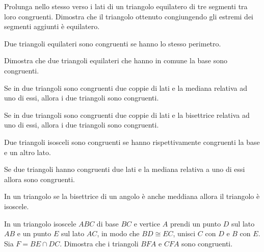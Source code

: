 \begin{multicols}{2}
\begin{esercizio}
\label{ese:2.54}
Prolunga nello stesso verso i lati di un triangolo equilatero di tre segmenti tra loro congruenti. Dimostra che il triangolo ottenuto congiungendo gli estremi dei segmenti aggiunti è equilatero.
\end{esercizio}

\begin{esercizio}
\label{ese:2.55}
Due triangoli equilateri sono congruenti se hanno lo stesso perimetro.
\end{esercizio}

\begin{esercizio}
\label{ese:2.56}
Dimostra che due triangoli equilateri che hanno in comune la base sono congruenti.
\end{esercizio}

\begin{esercizio}
\label{ese:2.57}
Se in due triangoli sono congruenti due coppie di lati e la mediana relativa ad uno di essi, allora i due triangoli sono congruenti.
\end{esercizio}

\begin{esercizio}
\label{ese:2.58}
Se in due triangoli sono congruenti due coppie di lati e la bisettrice relativa ad uno di essi, allora i due triangoli sono congruenti.
\end{esercizio}

\begin{esercizio}
\label{ese:2.59}
Due triangoli isosceli sono congruenti se hanno rispettivamente congruenti la base e un altro lato.
\end{esercizio}

\begin{esercizio}
\label{ese:2.60}
Se due triangoli hanno congruenti due lati e la mediana relativa a uno di essi allora sono congruenti.
\end{esercizio}

\begin{esercizio}
\label{ese:2.61}
In un triangolo se la bisettrice di un angolo è anche meddiana allora il triangolo è isoscele.
\end{esercizio}

\begin{esercizio}
\label{ese:2.62}
In un triangolo isoscele $ABC$ di base $BC$ e vertice $A$ prendi un punto $D$ sul lato $AB$ e un punto $E$ sul lato $AC$, in modo che $BD\cong EC$, unisci $C$ con $D$ e $B$ con $E$. Sia $F=BE\cap DC$. Dimostra che i triangoli $BFA$ e $CFA$ sono congruenti.
\end{esercizio}


\end{multicols}
